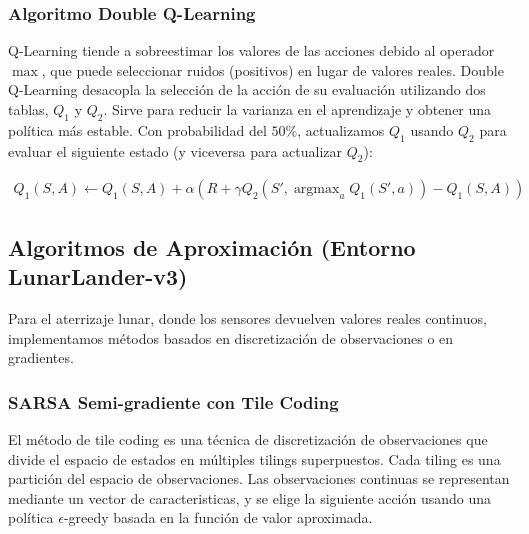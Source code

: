 \subsubsection{Algoritmo Double Q-Learning}

Q-Learning tiende a sobreestimar los valores de las acciones debido al operador $\max$, que puede seleccionar ruidos (positivos) en lugar de valores reales. Double Q-Learning desacopla la selección de la acción de su evaluación utilizando dos tablas, $Q_1$ y $Q_2$. Sirve para reducir la varianza en el aprendizaje y obtener una política más estable. Con probabilidad del $50\%$, actualizamos $Q_1$ usando $Q_2$ para evaluar el siguiente estado (y viceversa para actualizar $Q_2$):

{\footnotesize
\[
\begin{aligned}
Q_1(S, A) \leftarrow Q_1(S, A) + \alpha \left( R + \gamma Q_2(S', \operatorname{argmax}_a Q_1(S', a)) - Q_1(S, A) \right)
\end{aligned}
\]
}

\subsection{Algoritmos de Aproximación (Entorno LunarLander-v3)}

Para el aterrizaje lunar, donde los sensores devuelven valores reales continuos, 
implementamos métodos basados en discretización de observaciones o en gradientes.

\subsubsection{SARSA Semi-gradiente con Tile Coding}
El método de tile coding es una técnica de discretización de observaciones que 
divide el espacio de estados en múltiples tilings superpuestos. Cada tiling es 
una partición del espacio de observaciones. Las observaciones continuas se 
representan mediante un vector de caracteristicas, y se elige la siguiente acción 
usando una política $\epsilon$-greedy basada en la función de valor aproximada.

